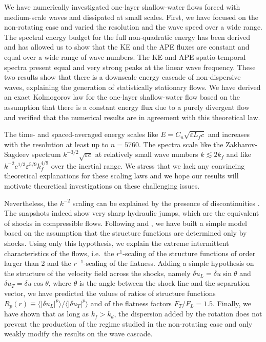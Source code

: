 \documentclass{jfm}
\newcommand{\eps}{\varepsilon}
\newcommand{\mean}[1]{\langle #1 \rangle}
\begin{document}
We have numerically investigated one-layer shallow-water flows forced
with medium-scale waves and dissipated at small scales.
%
First, we have focused on the non-rotating case and varied the
resolution and the wave speed over a wide range.
%
The spectral energy budget for the full non-quadratic energy has been
derived and has allowed us to show that the KE and the APE fluxes are
constant and equal over a wide range of wave numbers.
%
The KE and APE spatio-temporal spectra present equal and very strong
peaks at the linear wave frequency.
%
These two results show that there is a downscale energy cascade of
non-dispersive waves, explaining the generation of statistically
stationary flows.
%
We have derived an exact Kolmogorov law for the one-layer
shallow-water flow based on the assumption that there is a constant
energy flux due to a purely divergent flow and verified that the
numerical results are in agreement with this theoretical law.



The time- and spaced-averaged energy scales like $E = C_n \sqrt{\eps
L_f c}$ and increases with the resolution at least up to $n = 5760$.
The spectra scale like the Zakharov-Sagdeev spectrum $k^{-3/2}
\sqrt{\eps c}$ at relatively small wave numbers $k \lesssim 2 k_f$ and
like $k^{-2} c^{1/3} \eps^{5/9} k_f^{4/9}$ over the inertial range.
We stress that we lack any convincing theoretical explanations for
these scaling laws and we hope our results will motivate theoretical
investigations on these challenging issues.

Nevertheless, the $k^{-2}$ scaling can be explained by the presence of
discontinuities \cite[]{Kuznetsov2004}.  The snapshots indeed show
very sharp hydraulic jumps, which are the equivalent of shocks in
compressible flows.
%
Following \cite{BouchaudMezardParisi1995} and
\cite{WeinanKhaninMazelSinai1997}, we have built a simple model based
on the assumption that the structure functions are determined only by
shocks.
%
Using only this hypothesis, we explain the extreme intermittent
characteristics of the flows, i.e.\ the $r^1$-scaling of the structure
functions of order larger than 2 and the $r^{-1}$-scaling of the
flatness.
%
Adding a simple hypothesis on the structure of the velocity field
across the shocks, namely $\delta u_L = \delta u \sin\theta$ and
$\delta u_T = \delta u \cos\theta$, where $\theta$ is the angle
between the shock line and the separation vector, we have predicted
the values of ratios of structure functions $R_p(r) \equiv
\mean{|\delta u_L|^p}/\mean{|\delta u_T|^p}$ and of the flatness
factors $F_T/F_L = 1.5$.
%
%
Finally, we have shown that as long as $k_f>k_d$, the dispersion added
by the rotation does not prevent the production of the regime studied
in the non-rotating case and only weakly modify the results on the
wave cascade.
\end{document}
